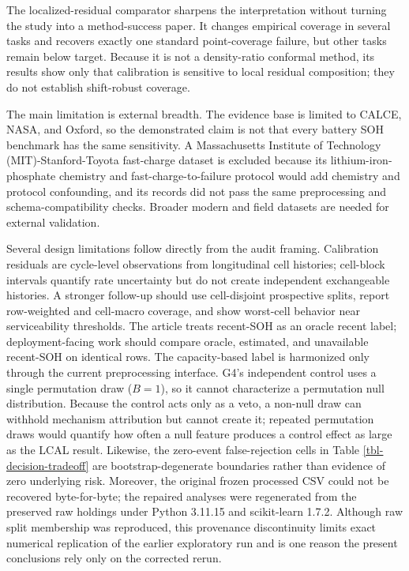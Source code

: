 \documentclass[
  number,
  preprint]{elsarticle}
\begin{document}
The localized-residual comparator sharpens the interpretation without
turning the study into a method-success paper. It changes empirical
coverage in several tasks and recovers exactly one standard
point-coverage failure, but other tasks remain below target. Because it
is not a density-ratio conformal method, its results show only that
calibration is sensitive to local residual composition; they do not
establish shift-robust coverage.

The main limitation is external breadth. The evidence base is limited to
CALCE, NASA, and Oxford, so the demonstrated claim is not that every
battery SOH benchmark has the same sensitivity. A Massachusetts
Institute of Technology (MIT)-Stanford-Toyota fast-charge dataset
\citep{severson2019datadriven} is excluded because its
lithium-iron-phosphate chemistry and fast-charge-to-failure protocol
would add chemistry and protocol confounding, and its records did not
pass the same preprocessing and schema-compatibility checks. Broader
modern and field datasets are needed for external validation.

Several design limitations follow directly from the audit framing.
Calibration residuals are cycle-level observations from longitudinal
cell histories; cell-block intervals quantify rate uncertainty but do
not create independent exchangeable histories. A stronger follow-up
should use cell-disjoint prospective splits, report row-weighted and
cell-macro coverage, and show worst-cell behavior near serviceability
thresholds. The article treats recent-SOH as an oracle recent label;
deployment-facing work should compare oracle, estimated, and unavailable
recent-SOH on identical rows. The capacity-based label is harmonized
only through the current preprocessing interface. G4's independent
control uses a single permutation draw (\(B=1\)), so it cannot
characterize a permutation null distribution. Because the control acts
only as a veto, a non-null draw can withhold mechanism attribution but
cannot create it; repeated permutation draws would quantify how often a
null feature produces a control effect as large as the LCAL result.
Likewise, the zero-event false-rejection cells in Table
\ref{tbl-decision-tradeoff} are bootstrap-degenerate boundaries rather
than evidence of zero underlying risk. Moreover, the original frozen
processed CSV could not be recovered byte-for-byte; the repaired
analyses were regenerated from the preserved raw holdings under Python
3.11.15 and scikit-learn 1.7.2. Although raw split membership was
reproduced, this provenance discontinuity limits exact numerical
replication of the earlier exploratory run and is one reason the present
conclusions rely only on the corrected rerun.
\end{document}
